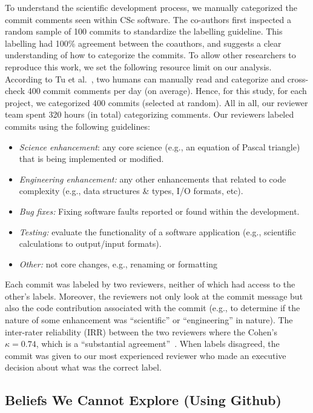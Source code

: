 \documentclass[conference,10pt]{IEEEtran}
\newcommand{\bi}{\begin{itemize}}
\newcommand{\ei}{\end{itemize}}
\begin{document}
To understand the scientific development process, we manually categorized the commit comments seen within CSc
software.  The co-authors first inspected a random sample of 100 commits to standardize the labelling guideline. This labelling had
100\% agreement between the coauthors, and suggests a clear understanding of how to categorize the commits. 
To allow other researchers to reproduce this work, we set
the following
resource limit on our analysis.
According to Tu et al.~\cite{tu2019better}, two humans can manually read and categorize
and cross-check 400 commit comments per day (on average).
Hence, for this study, for each project, we categorized 400 commits
(selected at random). 
All in all, our
reviewer team spent 320 hours (in total) categorizing comments. Our  reviewers
labeled commits using the following
guidelines:



\bi
\item {\em Science enhancement}: any core science (e.g., an equation of Pascal triangle) that is being implemented or modified.
\item {\em Engineering enhancement:} any other enhancements that related to code complexity (e.g., data structures \& types, I/O formats, etc).
\item {\em Bug fixes:} Fixing software faults reported or found within the development. 
\item {\em Testing: } evaluate the functionality of a software application (e.g., scientific calculations to output/input formats).
\item
{\em Other:} not core changes, e.g., renaming or formatting 
\ei

 

Each commit was labeled by two reviewers,
neither of which had access to the other's labels. Moreover, the reviewers not only look at the commit message but also the code contribution associated with the commit (e.g., to determine if the nature of some enhancement was 
``scientific'' or ``engineering'' in nature). The inter-rater reliability (IRR) between the two reviewers where the Cohen's $\kappa = 0.74$, which is a ``substantial agreement''~\cite{irr_kappa}. When labels disagreed, the commit was given to our most experienced reviewer who made an executive decision about what
was the correct label. 

\subsection{Beliefs We Cannot Explore (Using Github)}\label{tion:cannot}
\end{document}
